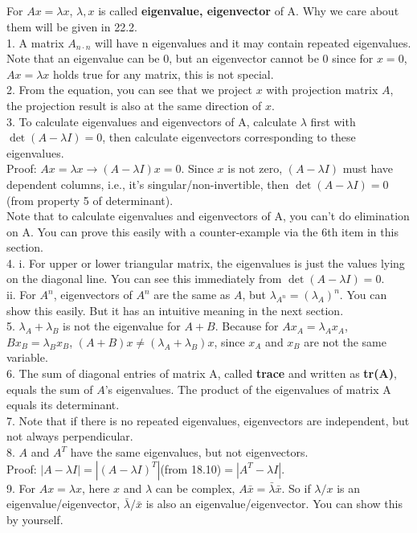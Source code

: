\documentclass{article}
\begin{document}
\begin{spacing}{1.5}
\section{}
For $Ax=\lambda x$, $\lambda, x$ is called {\bfseries eigenvalue, eigenvector} of A. Why we care about them will be given in 22.2. \\
1. A matrix $A_{n\cdot n}$ will have n eigenvalues and it may contain repeated eigenvalues. Note that an eigenvalue can be 0, but an eigenvector cannot be 0 since for $x=0$, $Ax=\lambda x$ holds true for any matrix, this is not special. \\
2. From the equation, you can see that we project $x$ with projection matrix $A$, the projection result is also at the same direction of $x$. \\
3. To calculate eigenvalues and eigenvectors of A, calculate $\lambda$ first with $\det(A-\lambda I) = 0$, then calculate eigenvectors corresponding to these eigenvalues. \\ 
Proof: $Ax=\lambda x \rightarrow (A-\lambda I)x = 0 $. Since $x$ is not zero, $(A-\lambda I)$ must have dependent columns, i.e., it's singular/non-invertible, then $\det(A-\lambda I) = 0$(from property 5 of determinant). \\
Note that to calculate eigenvalues and eigenvectors of A, you can't do elimination on A. You can prove this easily with a counter-example via the 6th item in this section.\\
4. i. For upper or lower triangular matrix, the eigenvalues is just the values lying on the diagonal line. You can see this immediately from $\det(A-\lambda I) = 0$. \\
ii. For $A^n$, eigenvectors of $A^n$ are the same as $A$, but $\lambda_{A^n}=(\lambda_A)^n$. You can show this easily. But it has an intuitive meaning in the next section. \\
5. $\lambda_A + \lambda_B$ is not the eigenvalue for $A+B$. Because for $Ax_A=\lambda_Ax_A$, $Bx_B=\lambda_Bx_B$, $(A+B)x\neq(\lambda_A + \lambda_B)x$, since $x_A$ and $x_B$ are not the same variable. \\
6. The sum of diagonal entries of matrix A, called {\bfseries trace} and written as {\bfseries tr(A)}, equals the sum of $A$'s eigenvalues. The product of the eigenvalues of matrix A equals its determinant. \\
7. Note that if there is no repeated eigenvalues, eigenvectors are independent, but not always perpendicular. \\
8.  $A$ and $A^T$ have the same eigenvalues, but not eigenvectors. \\
Proof: $|A-\lambda I|=|(A-\lambda I)^T|$(from 18.10)$=|A^T-\lambda I|$. \\
9. For $Ax=\lambda x$, here $x$ and $\lambda$ can be complex, $A\bar x=\bar\lambda \bar x$. So if $\lambda/x$ is an eigenvalue/eigenvector, $\bar \lambda /\bar x$ is also an eigenvalue/eigenvector. You can show this by yourself. 



\end{spacing}
\end{document}
